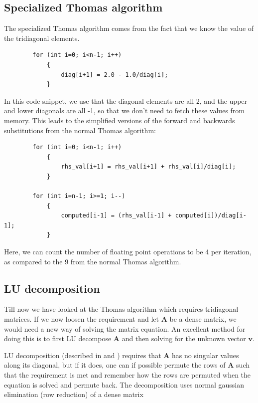 \documentclass{emulateapj}
\begin{document}
\subsection{Specialized Thomas algorithm}
\label{sec:special_thomas}

    The specialized Thomas algorithm comes from the fact that we know the value of the tridiagonal elements.
    
    \begin{lstlisting}
        for (int i=0; i<n-1; i++)
            {
                diag[i+1] = 2.0 - 1.0/diag[i];
            }
    \end{lstlisting}{}
    In this code snippet, we use that the diagonal elements are all 2, and the upper and lower diagonals are all -1, so that we don't need to fetch these values from memory. This leads to the simplified versions of the forward and backwards substitutions from the normal Thomas algorithm:
    
    \begin{lstlisting}
        for (int i=0; i<n-1; i++)
            {
                rhs_val[i+1] = rhs_val[i+1] + rhs_val[i]/diag[i];
            }
            
        for (int i=n-1; i>=1; i--)
            {
                computed[i-1] = (rhs_val[i-1] + computed[i])/diag[i-1];
            }
    \end{lstlisting}{}
    Here, we can count the number of floating point operations to be 4 per iteration, as compared to the 9 from the normal Thomas algorithm.

\subsection{LU decomposition}

Till now we have looked at the Thomas algorithm which requires tridiagonal matrices. If we now loosen the requirement and let \(\textbf{A}\) be a dense matrix, we would need a new way of solving the matrix equation. An excellent method for doing this is to first LU decompose \(\textbf{A}\) and then solving for the unknown vector \(\textbf{v}\).

LU decomposition (described in \cite[Chapter 2]{linalg} and \cite[Chapter 6]{compfys}) requires that \(\textbf{A}\) has no singular values along its diagonal, but if it does, one can if possible permute the rows of \(\textbf{A}\) such that the requirement is met and remember how the rows are permuted when the equation is solved and permute back. The decomposition uses normal gaussian elimination (row reduction) of a dense matrix 
\end{document}
